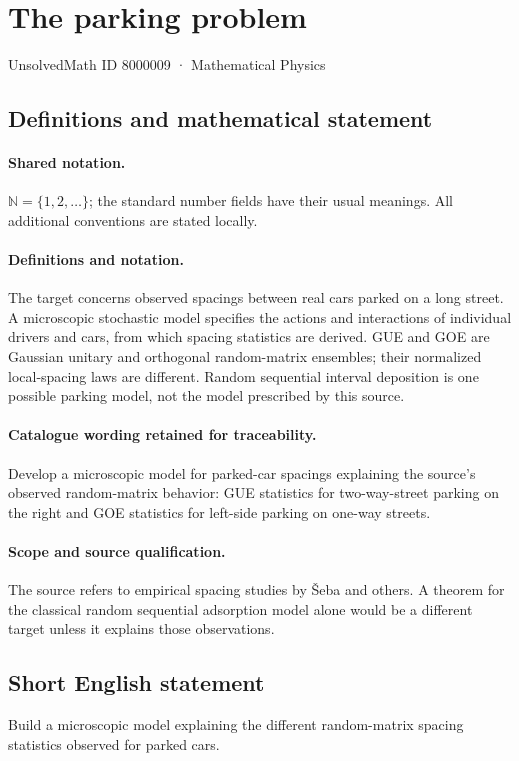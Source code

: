 \documentclass[11pt]{article}
\begin{document}
\setcounter{section}{8000008}
\section{The parking problem}\label{8000009}
{\small UnsolvedMath ID 8000009 · Mathematical Physics}
\subsection{Definitions and mathematical statement}

\paragraph{Shared notation.}$\mathbb N=\{1,2,\ldots\}$; the standard number fields have their usual meanings. All additional conventions are stated locally.


\paragraph{Definitions and notation.}The target concerns observed spacings between real cars parked on a long street. A microscopic stochastic model specifies the actions and interactions of individual drivers and cars, from which spacing statistics are derived. GUE and GOE are Gaussian unitary and orthogonal random-matrix ensembles; their normalized local-spacing laws are different. Random sequential interval deposition is one possible parking model, not the model prescribed by this source.

\paragraph{Catalogue wording retained for traceability.}
Develop a microscopic model for parked-car spacings explaining the source’s observed random-matrix behavior: GUE statistics for two-way-street parking on the right and GOE statistics for left-side parking on one-way streets.
\paragraph{Scope and source qualification.}The source refers to empirical spacing studies by Šeba and others. A theorem for the classical random sequential adsorption model alone would be a different target unless it explains those observations.
\subsection{Short English statement}
Build a microscopic model explaining the different random-matrix spacing statistics observed for parked cars.
\end{document}
